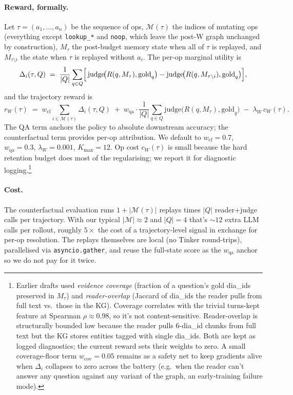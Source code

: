 \documentclass[11pt]{article}
\begin{document}
\paragraph{Reward, formally.} Let $\tau = (a_1, \dots, a_n)$ be the
sequence of ops, $\mathcal{M}(\tau)$ the indices of mutating ops
(everything except \texttt{lookup\_*} and \texttt{noop}, which leave
the post-W graph unchanged by construction), $M_\tau$ the post-budget
memory state when all of $\tau$ is replayed, and $M_{\tau\setminus i}$
the state when $\tau$ is replayed without $a_i$. The per-op marginal
utility is
\begin{equation}
  \Delta_i(\tau, Q) \;=\; \frac{1}{|Q|} \sum_{q \in Q}
    \Bigl[\, \mathrm{judge}\!\bigl(R(q, M_\tau), \mathrm{gold}_q\bigr)
        - \mathrm{judge}\!\bigl(R(q, M_{\tau\setminus i}), \mathrm{gold}_q\bigr) \Bigr],
\end{equation}
and the trajectory reward is
\begin{equation}
  r_W(\tau) \;=\; w_{\text{cf}} \!\!\sum_{i \in \mathcal{M}(\tau)} \!\!
      \Delta_i(\tau, Q)
  \;+\; w_{\text{qa}} \!\cdot\! \frac{1}{|Q|} \sum_{q \in Q}
      \mathrm{judge}\!\bigl(R(q, M_\tau), \mathrm{gold}_q\bigr)
  \;-\; \lambda_W \, c_W(\tau).
\end{equation}
The QA term anchors the policy to absolute downstream accuracy; the
counterfactual term provides per-op attribution. We default to
$w_{\text{cf}} = 0.7$, $w_{\text{qa}} = 0.3$, $\lambda_W = 0.001$,
$K_{\max} = 12$. Op cost $c_W(\tau)$ is small because the hard
retention budget does most of the regularising; we report it for
diagnostic logging.\footnote{Earlier drafts used \emph{evidence
  coverage} (fraction of a question's gold dia\_ids preserved in $M_\tau$)
  and \emph{reader-overlap} (Jaccard of dia\_ids the reader pulls from
  full text vs.\ those in the KG). Coverage correlates with the trivial
  turns-kept feature at Spearman $\rho \approx 0.98$, so it's not
  content-sensitive. Reader-overlap is structurally bounded low because
  the reader pulls 6-dia\_id chunks from full text but the KG stores
  entities tagged with single dia\_ids. Both are kept as logged
  diagnostics; the current reward sets their weights to zero. A small
  coverage-floor term $w_{\mathrm{cov}} = 0.05$ remains as a safety net
  to keep gradients alive when $\Delta_i$ collapses to zero across the
  battery (e.g.\ when the reader can't answer any question against any
  variant of the graph, an early-training failure mode).}

\paragraph{Cost.} The counterfactual evaluation runs $1 +
|\mathcal{M}(\tau)|$ replays times $|Q|$ reader+judge calls per
trajectory. With our typical $|\mathcal{M}| \approx 2$ and $|Q| = 4$
that's $\sim 12$ extra LLM calls per rollout, roughly $5\times$ the
cost of a trajectory-level signal in exchange for per-op resolution.
The replays themselves are local (no Tinker round-trips), parallelised
via \texttt{asyncio.gather}, and reuse the full-state score as the
$w_{\text{qa}}$ anchor so we do not pay for it twice.
\end{document}
